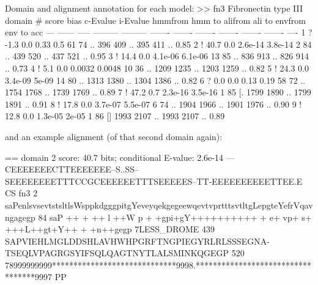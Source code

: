 \begin{sreoutput}
Domain and alignment annotation for each model:
>> fn3  Fibronectin type III domain
   #    score  bias  c-Evalue  i-Evalue hmmfrom  hmm to    alifrom  ali to    envfrom  env to     acc
 ---   ------ ----- --------- --------- ------- -------    ------- -------    ------- -------    ----
   1 ?   -1.3   0.0      0.33       0.5      61      74 ..     396     409 ..     395     411 .. 0.85
   2 !   40.7   0.0   2.6e-14   3.8e-14       2      84 ..     439     520 ..     437     521 .. 0.95
   3 !   14.4   0.0   4.1e-06   6.1e-06      13      85 ..     836     913 ..     826     914 .. 0.73
   4 !    5.1   0.0    0.0032    0.0048      10      36 ..    1209    1235 ..    1203    1259 .. 0.82
   5 !   24.3   0.0   3.4e-09     5e-09      14      80 ..    1313    1380 ..    1304    1386 .. 0.82
   6 ?    0.0   0.0      0.13      0.19      58      72 ..    1754    1768 ..    1739    1769 .. 0.89
   7 !   47.2   0.7   2.3e-16   3.5e-16       1      85 [.    1799    1890 ..    1799    1891 .. 0.91
   8 !   17.8   0.0   3.7e-07   5.5e-07       6      74 ..    1904    1966 ..    1901    1976 .. 0.90
   9 !   12.8   0.0   1.3e-05     2e-05       1      86 []    1993    2107 ..    1993    2107 .. 0.89
\end{sreoutput}

and an example alignment (of that second domain again):

\begin{sreoutput}
  == domain 2    score: 40.7 bits;  conditional E-value: 2.6e-14
                  ---CEEEEEEECTTEEEEEEE--S..SS--SEEEEEEEETTTCCGCEEEEEETTTSEEEEES--TT-EEEEEEEEEETTEE.E CS
          fn3   2 saPenlsvsevtstsltlsWsppkdgggpitgYeveyqekgegeewqevtvprtttsvtltgLepgteYefrVqavngagegp 84 
                  saP   ++ +  ++ l ++W p +  +gpi+gY++++++++++  + e+ vp+   s+ +++L++gt+Y++ +  +n++gegp
  7LESS_DROME 439 SAPVIEHLMGLDDSHLAVHWHPGRFTNGPIEGYRLRLSSSEGNA-TSEQLVPAGRGSYIFSQLQAGTNYTLALSMINKQGEGP 520
                  78999999999*****************************9998.**********************************9997 PP
\end{sreoutput}

